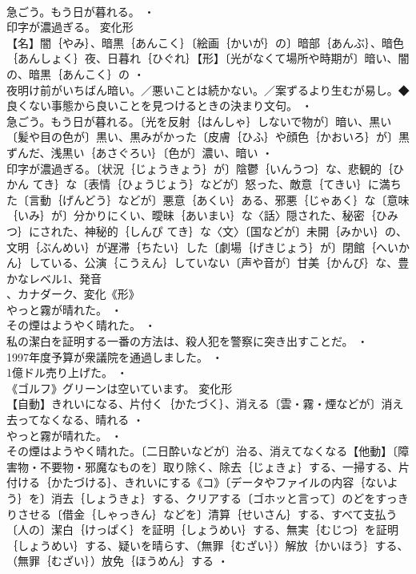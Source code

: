 \documentclass[8pt]{extreport}
\begin{document}
\begin{CJK}{UTF8}{min}
\\	急ごう。もう日が暮れる。 ・
\\	印字が濃過ぎる。	変化形 
\\	【名】闇｛やみ｝、暗黒｛あんこく｝〔絵画｛かいが｝の〕暗部｛あんぶ｝、暗色｛あんしょく｝夜、日暮れ｛ひぐれ｝【形】〔光がなくて場所や時期が〕暗い、闇の、暗黒｛あんこく｝の ・
\\	夜明け前がいちばん暗い。／悪いことは続かない。／案ずるより生むが易し。◆良くない事態から良いことを見つけるときの決まり文句。 ・
\\	急ごう。もう日が暮れる。〔光を反射｛はんしゃ｝しないで物が〕暗い、黒い〔髪や目の色が〕黒い、黒みがかった〔皮膚｛ひふ｝や顔色｛かおいろ｝が〕黒ずんだ、浅黒い｛あさぐろい｝〔色が〕濃い、暗い ・
\\	印字が濃過ぎる。〔状況｛じょうきょう｝が〕陰鬱｛いんうつ｝な、悲観的｛ひかん てき｝な〔表情｛ひょうじょう｝などが〕怒った、敵意｛てきい｝に満ちた〔言動｛げんどう｝などが〕悪意｛あくい｝ある、邪悪｛じゃあく｝な〔意味｛いみ｝が〕分かりにくい、曖昧｛あいまい｝な〈話〉隠された、秘密｛ひみつ｝にされた、神秘的｛しんぴ てき｝な〈文〉〔国などが〕未開｛みかい｝の、文明｛ぶんめい｝が遅滞｛ちたい｝した〔劇場｛げきじょう｝が〕閉館｛へいかん｝している、公演｛こうえん｝していない〔声や音が〕甘美｛かんび｝な、豊かなレベル1、発音
\\	、カナダーク、変化《形》
\\	やっと霧が晴れた。 ・
\\	その煙はようやく晴れた。 ・
\\	私の潔白を証明する一番の方法は、殺人犯を警察に突き出すことだ。 ・
\\	1997年度予算が衆議院を通過しました。 ・
\\	1億ドル売り上げた。 ・
\\	《ゴルフ》グリーンは空いています。	変化形 
\\	【自動】きれいになる、片付く｛かたづく｝、消える〔雲・霧・煙などが〕消え去ってなくなる、晴れる ・
\\	やっと霧が晴れた。 ・
\\	その煙はようやく晴れた。〔二日酔いなどが〕治る、消えてなくなる【他動】〔障害物・不要物・邪魔なものを〕取り除く、除去｛じょきょ｝する、一掃する、片付ける｛かたづける｝、きれいにする《コ》〔データやファイルの内容｛ないよう｝を〕消去｛しょうきょ｝する、クリアする〔ゴホッと言って〕のどをすっきりさせる〔借金｛しゃっきん｝などを〕清算｛せいさん｝する、すべて支払う〔人の〕潔白｛けっぱく｝を証明｛しょうめい｝する、無実｛むじつ｝を証明｛しょうめい｝する、疑いを晴らす、（無罪｛むざい｝）解放｛かいほう｝する、（無罪｛むざい｝）放免｛ほうめん｝する ・

\end{CJK}
\end{document}
